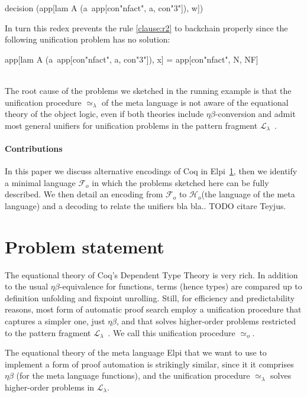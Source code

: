 \documentclass[sigconf,natbib=false]{acmart}
\newcommand{\UnifRel}{\ensuremath{\simeq}}
\newcommand{\Uo}{\ensuremath{\UnifRel_o}\xspace}
\newcommand{\Ue}{\ensuremath{\UnifRel_\lambda}\xspace}
\newcommand{\llambda}{\ensuremath{\mathcal{L}_\lambda}\xspace}
\newcommand{\Fo}{\ensuremath{\mathcal{F}_{\!o}\xspace}} %
\newcommand{\Ho}{\ensuremath{\mathcal{H}_o}\xspace}
\begin{document}
\begin{elpicode}
decision (app[lam A (a\ app[con"nfact", a, con"3"]), w])
\end{elpicode}

\noindent
In turn this redex prevents the rule \ref{clause:r2} to backchain properly since
the following unification problem has no solution:

\begin{elpicode}
app[lam A (a\ app[con"nfact", a, con"3"]), x] =
app[con"nfact", N, NF]
\end{elpicode}
\noindent
~\\
The root cause of the problems we sketched in the running example
is that the unification procedure \Ue of the meta language is not aware
of the equational theory of the object logic, even if both theories
include $\eta\beta$-conversion and admit most general
unifiers for unification problems in the pattern fragment \llambda~\cite{miller92jsc}.

\paragraph{Contributions}
In this paper we discuss alternative encodings of Coq in
Elpi~\ref{sec:encodings}, then we identify a minimal language \Fo
in which the problems sketched here can be fully described.
We then detail an encoding  from \Fo{} to \Ho (the language of
the meta language) and a decoding  to relate the unifiers
bla bla.. TODO citare Teyjus.

\section{Problem statement} %
\label{sec:encodings}

The equational theory of Coq's Dependent Type Theory is very rich. In
addition to the usual $\eta\beta$-equivalence for functions, terms (hence types)
are compared up to definition unfolding and fixpoint unrolling. Still,
for efficiency and predictability reasons, most form of automatic proof search
employ a unification procedure that captures a simpler one,
just $\eta\beta$, and that solves higher-order problems
restricted to the pattern fragment $\mathcal{L}_\lambda$~\cite{miller92jsc}.
We call this unification procedure \Uo{}.

The equational theory of the meta language Elpi that we want to use to
implement a form of proof automation is strikingly similar, since it
it comprises $\eta\beta$ (for the meta language functions), and the
unification procedure \Ue{} solves higher-order problems in
$\mathcal{L}_\lambda$.
\end{document}
